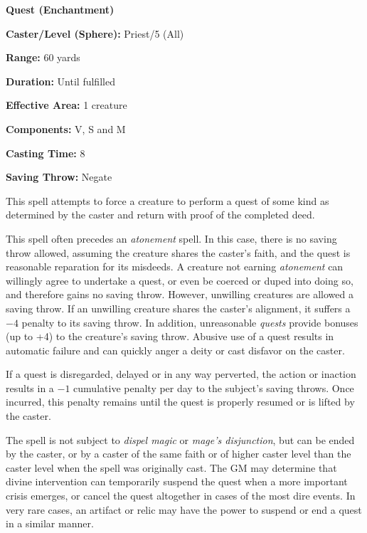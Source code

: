 \begin{multicols}{2}
\noindent
\begin{minipage}{\columnwidth}

\noindent \textbf{Quest (Enchantment)}

\noindent \textbf{Caster/Level (Sphere):} Priest/5 (All)

\noindent \textbf{Range:} 60 yards

\noindent \textbf{Duration:} Until fulfilled

\noindent \textbf{Effective Area:} 1 creature

\noindent \textbf{Components:} V, S and M

\noindent \textbf{Casting Time:} 8

\noindent \textbf{Saving Throw:} Negate

\end{minipage}

This spell attempts to force a creature to perform a quest of some kind as determined by the caster and return with proof of the completed deed.  

This spell often precedes an \textit{atonement} spell.  In this case, there is no saving throw allowed, assuming the creature shares the caster's faith, and the quest is reasonable reparation for its misdeeds.  A creature not earning \textit{atonement} can willingly agree to undertake a quest, or even be coerced or duped into doing so, and therefore gains no saving throw.  However, unwilling creatures are allowed a saving throw.  If an unwilling creature shares the caster's alignment, it suffers a $-4$ penalty to its saving throw.  In addition, unreasonable \textit{quests} provide bonuses (up to +4) to the creature's saving throw.  Abusive use of a quest results in automatic failure and can quickly anger a deity or cast disfavor on the caster. 

If a quest is disregarded, delayed or in any way perverted, the action or inaction results in a $-1$ cumulative penalty per day to the subject's saving throws.  Once incurred, this penalty remains until the quest is properly resumed or is lifted by the caster.  

The spell is not subject to \textit{dispel magic} or \textit{mage's disjunction}, but can be ended by the caster, or by a caster of the same faith or of higher caster level than the caster level when the spell was originally cast.  The GM may determine that divine intervention can temporarily suspend the quest when a more important crisis emerges, or cancel the quest altogether in cases of the most dire events.  In very rare cases, an artifact or relic may have the power to suspend or end a quest in a similar manner.


\end{multicols}
